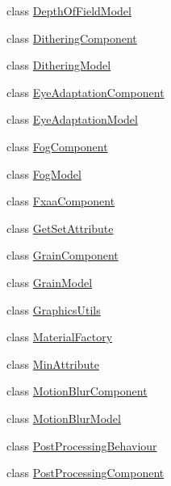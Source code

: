 \begin{DoxyCompactItemize}
\item 
class \hyperlink{class_unity_engine_1_1_post_processing_1_1_depth_of_field_model}{Depth\+Of\+Field\+Model}
\item 
class \hyperlink{class_unity_engine_1_1_post_processing_1_1_dithering_component}{Dithering\+Component}
\item 
class \hyperlink{class_unity_engine_1_1_post_processing_1_1_dithering_model}{Dithering\+Model}
\item 
class \hyperlink{class_unity_engine_1_1_post_processing_1_1_eye_adaptation_component}{Eye\+Adaptation\+Component}
\item 
class \hyperlink{class_unity_engine_1_1_post_processing_1_1_eye_adaptation_model}{Eye\+Adaptation\+Model}
\item 
class \hyperlink{class_unity_engine_1_1_post_processing_1_1_fog_component}{Fog\+Component}
\item 
class \hyperlink{class_unity_engine_1_1_post_processing_1_1_fog_model}{Fog\+Model}
\item 
class \hyperlink{class_unity_engine_1_1_post_processing_1_1_fxaa_component}{Fxaa\+Component}
\item 
class \hyperlink{class_unity_engine_1_1_post_processing_1_1_get_set_attribute}{Get\+Set\+Attribute}
\item 
class \hyperlink{class_unity_engine_1_1_post_processing_1_1_grain_component}{Grain\+Component}
\item 
class \hyperlink{class_unity_engine_1_1_post_processing_1_1_grain_model}{Grain\+Model}
\item 
class \hyperlink{class_unity_engine_1_1_post_processing_1_1_graphics_utils}{Graphics\+Utils}
\item 
class \hyperlink{class_unity_engine_1_1_post_processing_1_1_material_factory}{Material\+Factory}
\item 
class \hyperlink{class_unity_engine_1_1_post_processing_1_1_min_attribute}{Min\+Attribute}
\item 
class \hyperlink{class_unity_engine_1_1_post_processing_1_1_motion_blur_component}{Motion\+Blur\+Component}
\item 
class \hyperlink{class_unity_engine_1_1_post_processing_1_1_motion_blur_model}{Motion\+Blur\+Model}
\item 
class \hyperlink{class_unity_engine_1_1_post_processing_1_1_post_processing_behaviour}{Post\+Processing\+Behaviour}
\item 
class \hyperlink{class_unity_engine_1_1_post_processing_1_1_post_processing_component}{Post\+Processing\+Component}

\end{DoxyCompactItemize}
